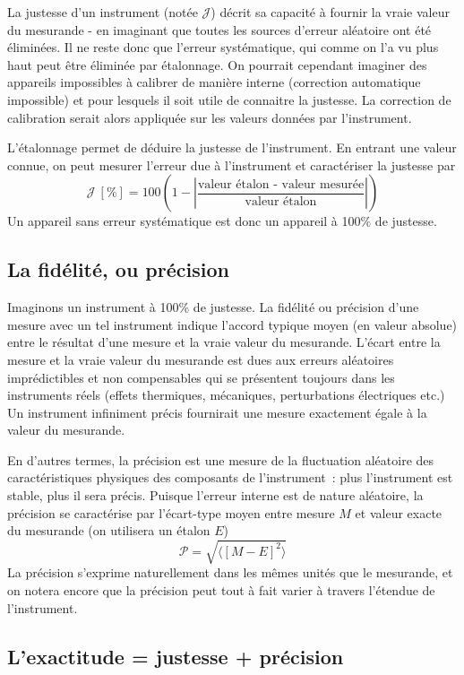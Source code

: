La justesse d'un instrument (notée $\mathcal{J}$) décrit sa capacité à fournir la vraie valeur du mesurande - en imaginant que toutes les sources d'erreur aléatoire ont été éliminées. Il ne reste donc que l'erreur systématique, qui comme on l'a vu plus haut peut être éliminée par étalonnage. On pourrait cependant imaginer des appareils impossibles à calibrer de manière interne (correction automatique impossible) et pour lesquels il soit utile de connaitre la justesse. La correction de calibration serait alors appliquée sur les valeurs données par l'instrument.

L'étalonnage permet de déduire la justesse de l'instrument. En entrant une valeur connue, on peut mesurer l'erreur due à l'instrument et caractériser la justesse par
$$
\mathcal{J}\ [\%]=100\left(1-\left|\frac{\text{valeur étalon - valeur mesurée}}{\text{valeur étalon}}\right|\right)
$$
Un appareil sans erreur systématique est donc un appareil à 100\% de justesse.

\subsection{La fidélité, ou précision}

Imaginons un instrument à 100\% de justesse. La fidélité ou précision d'une mesure avec un tel instrument indique l'accord typique moyen (en valeur absolue) entre le résultat d'une mesure et la vraie valeur du mesurande. L'écart entre la mesure et la vraie valeur du mesurande est dues aux erreurs aléatoires imprédictibles et non compensables qui se présentent toujours dans les instruments réels (effets thermiques, mécaniques, perturbations électriques etc.) Un instrument infiniment précis fournirait une mesure exactement égale à la valeur du mesurande.

En d'autres termes, la précision est une mesure de la fluctuation aléatoire des caractéristiques physiques des composants de l'instrument~: plus l'instrument est stable, plus il sera précis. Puisque l'erreur interne est de nature aléatoire, la précision se caractérise par l'écart-type moyen entre mesure $M$ et valeur exacte du mesurande (on utilisera un étalon $E$)
$$
\mathcal{P}=\sqrt{\langle[M-E]^2\rangle}
$$
La précision s'exprime naturellement dans les mêmes unités que le mesurande, et on notera encore que la précision peut tout à fait varier à travers l'étendue de l'instrument.

\subsection{L'exactitude = justesse + précision}

